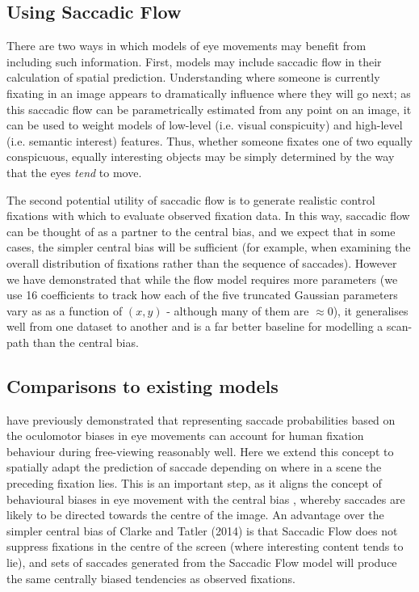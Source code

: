 \documentclass[a4paper, twocolumn, oneside, 11pt]{article}
\begin{document}
\subsection{Using Saccadic Flow}
There are two ways in which models of eye movements may benefit from including such information. First, models may include saccadic flow in their calculation of spatial prediction. Understanding where someone is currently fixating in an image appears to dramatically influence where they will go next; as this saccadic flow can be parametrically estimated from any point on an image, it can be used to weight models of low-level (i.e. visual conspicuity) and high-level (i.e. semantic interest) features. Thus, whether someone fixates one of two equally conspicuous, equally interesting objects may be simply determined by the way that the eyes \textit{tend} to move. 

The second potential utility of saccadic flow is to generate realistic control fixations with which to evaluate observed fixation data. In this way, saccadic flow can be thought of as a partner to the \cite{clarke-tatler2014} central bias, and we expect that in some cases, the simpler central bias will be sufficient (for example, when examining the overall distribution of fixations rather than the sequence of saccades). However we have demonstrated that while the flow model requires more parameters (we use 16 coefficients to track how each of the five truncated Gaussian parameters vary as as a function of $(x,y)$ - although many of them are $\approx 0$), it generalises well from one dataset to another and is a far better baseline for modelling a scan-path than the central bias.

\subsection{Comparisons to existing models}
\citet{tatler-vincent2009} have previously demonstrated that representing saccade probabilities based on the oculomotor biases in eye movements can account for human fixation behaviour during free-viewing reasonably well. Here we extend this concept to spatially adapt the prediction of saccade depending on where in a scene the preceding fixation lies. This is an important step, as it aligns the concept of behavioural biases in eye movement with the central bias \citep{tatler2007}, whereby saccades are likely to be directed towards the centre of the image. An advantage over the simpler central bias of Clarke and Tatler (2014) is that Saccadic Flow does not suppress fixations in the centre of the screen (where interesting content tends to lie), and sets of saccades generated from the Saccadic Flow model will produce the same centrally biased tendencies as observed fixations.
\end{document}
